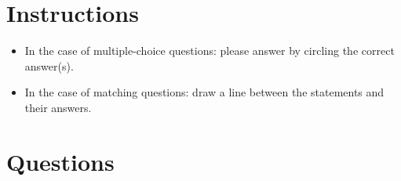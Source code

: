 \documentclass[11pt,a4paper,twoside]{article} %
\begin{document}
\maketitle
\thispagestyle{fancy}
\newpage

\section*{Instructions}
\begin{itemize}
    \item In the case of multiple-choice questions: please answer by 
          circling the correct answer(s). 
    \item In the case of matching questions: draw a line between the 
          statements and their answers. 
\end{itemize}
\section*{Questions}
\end{document}

